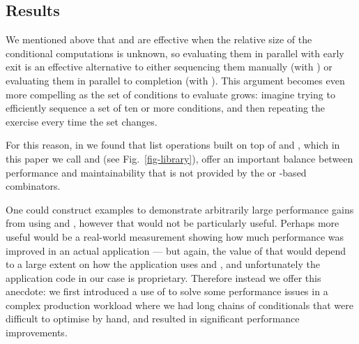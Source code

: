\subsection{Results}

We mentioned above that  and  are effective when the
relative size of the conditional computations is unknown, so
evaluating them in parallel with early exit is an effective
alternative to either sequencing them manually (with ) or
evaluating them in parallel to completion (with
). This argument becomes even more compelling as the
set of conditions to evaluate grows: imagine trying to efficiently
sequence a set of ten or more conditions, and then repeating the
exercise every time the set changes.

For this reason, in \Haxl we found that list operations built on top
of  and , which in this paper we call  and
 (see Fig.~\ref{fig-library}), offer an important balance
between performance and maintainability that is not provided by the
 or -based combinators.

One could construct examples to demonstrate arbitrarily large
performance gains from using  and , however that
would not be particularly useful. Perhaps more useful would be a
real-world measurement showing how much performance was improved in an
actual application --- but again, the value of that would depend to a
large extent on how the application uses  and , and
unfortunately the application code in our case is
proprietary. Therefore instead we offer this anecdote: we first
introduced a use of  to solve some performance issues in a
complex production workload where we had long chains of conditionals
that were difficult to optimise by hand, and  resulted in
significant performance improvements.
